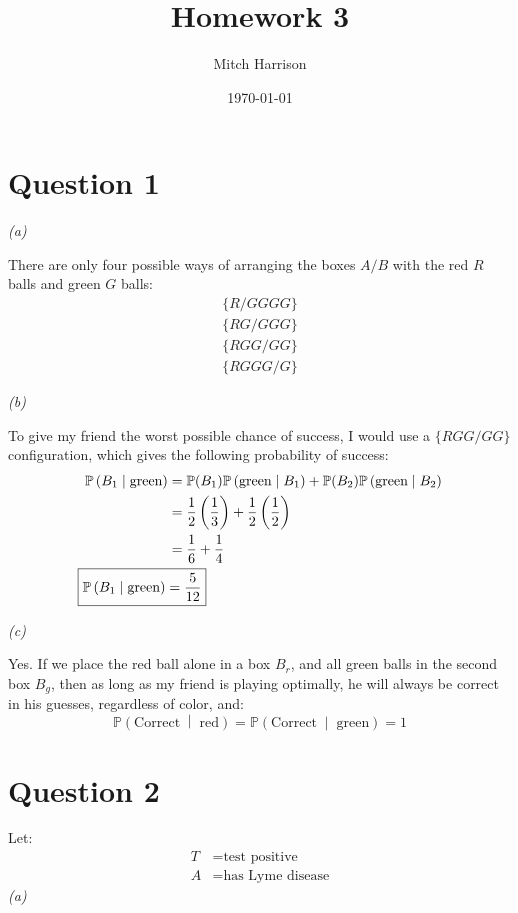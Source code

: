 \documentclass[titlepage, 12pt, leqno]{article}
\title{\Huge{Homework 3}}
\author{\large{Mitch Harrison}}
\date{\today}
\begin{document}
\setlength{\parskip}{1\baselineskip}
\setlength{\parindent}{15pt}
\maketitle
\tableofcontents
\newpage


\section{Question 1}
\textit{(a)} 

There are only four possible ways of arranging the boxes $A/B$ with the red $R$ balls and green $G$ balls:
\begin{align*}
    \{R/GGGG\} \\
    \{RG/GGG\} \\
    \{RGG/GG\} \\
    \{RGGG/G\}
\end{align*}


\textit{(b)} 

To give my friend the worst possible chance of success, I would use a $\{RGG/GG\}$ configuration, which gives the following probability of success:
\begin{align*}
    \mathbb{P}\left(B_1 \;\middle|\; \text{green}\right) &= \mathbb{P}(B_1) \mathbb{P}\left(\text{green} \;\middle|\; B_1\right) + \mathbb{P}(B_2) \mathbb{P}\left(\text{green} \;\middle|\; B_2\right) \\
                                                         &= \frac{1}{2} \left(\frac{1}{3} \right) + \frac{1}{2} \left(\frac{1}{2} \right) \\
                                                         &= \frac{1}{6} + \frac{1}{4} \\
\Aboxed{\mathbb{P}\left(B_1 \;\middle|\; \text{green}\right) &= \frac{5}{12}} 
\end{align*}

\textit{(c)}

Yes. If we place the red ball alone in a box $B_r$, and all green balls in the second box $B_g$, then as long as my friend is playing optimally, he will always be correct in his guesses, regardless of color, and:
\[
\boxed{ \mathbb{P}\left(\text{Correct} \;\middle|\; \text{red}\right) = \mathbb{P}\left(\text{Correct} \;\middle|\; \text{green}\right) = 1} 
\]
\pagebreak
\section{Question 2}
Let:
\begin{align*}
    T &= \text{test positive} \\
    A &= \text{has Lyme disease}
\end{align*}
\textit{(a)} 
\end{document}
